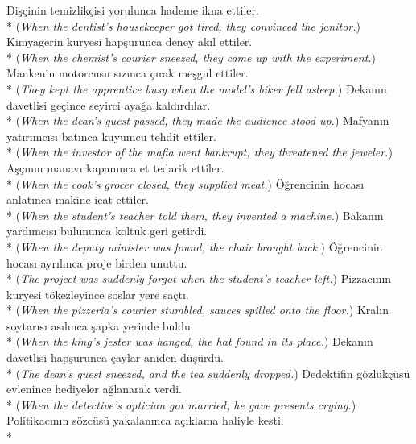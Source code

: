 \ex Di\c{s}\c{c}inin temizlik\c{c}isi yorulunca hademe ikna ettiler.\\*
({\it When the dentist's housekeeper got tired, they convinced the janitor.})
\ex Kimyagerin kuryesi hap\c{s}urunca deney ak{\i}l ettiler.\\*
({\it When the chemist's courier sneezed, they came up with the experiment.})
\ex Mankenin motorcusu s{\i}z{\i}nca \c{c}{\i}rak me\c{s}gul ettiler.\\*
({\it They kept the apprentice busy when the model's biker fell asleep.})
\ex Dekan{\i}n davetlisi ge\c{c}ince seyirci aya\u{g}a kald{\i}rd{\i}lar.\\*
({\it When the dean's guest passed, they made the audience stood up.})
\ex Mafyan{\i}n yat{\i}r{\i}mc{\i}s{\i} bat{\i}nca kuyumcu tehdit ettiler.\\*
({\it When the investor of the mafia went bankrupt, they threatened the jeweler.})
\ex A\c{s}\c{c}{\i}n{\i}n manav{\i} kapan{\i}nca et tedarik ettiler.\\*
({\it When the cook's grocer closed, they supplied meat.})
\ex \"{O}\u{g}rencinin hocas{\i} anlat{\i}nca makine icat ettiler.\\*
({\it When the student's teacher told them, they invented a machine.})
\z
{}
\ea * Bakan{\i}n yard{\i}mc{\i}s{\i} bulununca koltuk geri getirdi.\\*
({\it * When the deputy minister was found, the chair brought back.})
\ex * \"{O}\u{g}rencinin hocas{\i} ayr{\i}l{\i}nca proje birden unuttu.\\*
({\it * The project was suddenly forgot when the student's teacher left.})
\ex * Pizzac{\i}n{\i}n kuryesi t\"{o}kezleyince soslar yere sa\c{c}t{\i}.\\*
({\it *  When the pizzeria's courier stumbled, sauces spilled onto the floor.})
\ex * Kral{\i}n soytar{\i}s{\i} as{\i}l{\i}nca \c{s}apka yerinde buldu.\\*
({\it * When the king's jester was hanged, the hat found in its place.})
\ex * Dekan{\i}n davetlisi hap\c{s}urunca \c{c}aylar aniden d\"{u}\c{s}\"{u}rd\"{u}.\\*
({\it * The dean's guest sneezed, and the tea suddenly dropped.})
\ex * Dedektifin g\"{o}zl\"{u}k\c{c}\"{u}s\"{u} evlenince hediyeler a\u{g}lanarak verdi.\\*
({\it * When the detective's optician got married, he gave presents crying.})
\ex * Politikac{\i}n{\i}n s\"{o}zc\"{u}s\"{u} yakalan{\i}nca a\c{c}{\i}klama haliyle kesti.\\*
